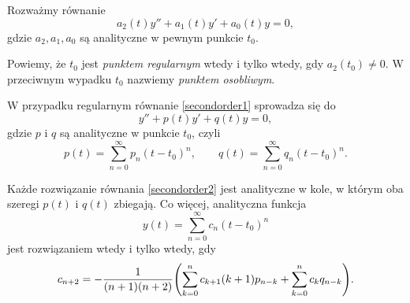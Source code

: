
Rozważmy równanie
%
\begin{equation} \label{secondorder1}
  a_2(t) y'' + a_1(t)y' + a_0(t)y = 0,
\end{equation}
%
gdzie $a_2,a_1,a_0$ są analityczne w pewnym punkcie $t_0$.
%
\begin{definition}
  Powiemy, że $t_0$ jest \emph{punktem regularnym} wtedy i tylko wtedy, gdy $a_2(t_0) \not= 0$. W przeciwnym wypadku 
  $t_0$ nazwiemy \emph{punktem osobliwym}.
\end{definition}
%
W przypadku regularnym równanie \eqref{secondorder1} sprowadza się do
%
\begin{equation} \label{secondorder2}
  y'' + p(t)y' + q(t)y = 0,
\end{equation}
%
gdzie $p$ i $q$ są analityczne w punkcie $t_0$, czyli
%
\begin{equation*}
  p(t) = \sum_{n=0}^{\infty} p_n(t-t_0)^n, \qquad q(t) = \sum_{n=0}^{\infty} q_n(t-t_0)^n.
\end{equation*}
%
\begin{theorem}
  Każde rozwiązanie równania \eqref{secondorder2} jest analityczne w kole, w którym oba szeregi $p(t)$ i $q(t)$ 
  zbiegają. Co więcej, analityczna funkcja
  \begin{equation*}
    y(t) = \sum_{n=0}^{\infty}c_n(t - t_0)^n
  \end{equation*}
  jest rozwiązaniem wtedy i tylko wtedy, gdy
  \begin{equation} \label{rr}
    c_{n+2} = - \frac{1}{(n+1)(n+2)} \p*{ \sum_{k=0}^{n} c_{k+1}(k+1)p_{n-k} + \sum_{k=0}^{n} c_k q_{n-k} }.
  \end{equation}
\end{theorem}
%
